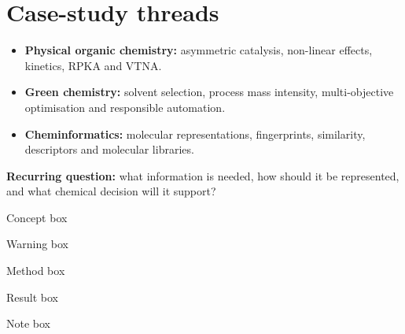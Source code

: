 \section*{Case-study threads}
\begin{itemize}
  \item \textbf{Physical organic chemistry:} asymmetric catalysis, non-linear effects, kinetics, RPKA and VTNA.
  \item \textbf{Green chemistry:} solvent selection, process mass intensity, multi-objective optimisation and responsible automation.
  \item \textbf{Cheminformatics:} molecular representations, fingerprints, similarity, descriptors and molecular libraries.
\end{itemize}

\begin{insightbox}
\textbf{Recurring question:} what information is needed, how should it be represented, and what chemical decision will it support?
\end{insightbox}

\begin{conceptbox}
  Concept box
\end{conceptbox}

\begin{warningbox}
  Warning box
\end{warningbox}

\begin{methodbox}
  Method box
\end{methodbox}

\begin{resultbox}
  Result box
\end{resultbox}

\begin{notebox}
  Note box
\end{notebox}